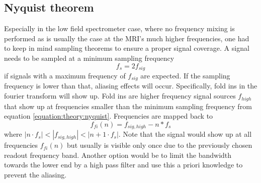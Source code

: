             \subsection{Nyquist theorem}
            Especially in the low field spectrometer case, where no frequency mixing is performed as is usually the case at the MRI's much higher frequencies, one had to keep in mind sampling theorems to ensure a proper signal coverage. A signal needs to be sampled at a minimum sampling frequency \cite{shannon_mathematical_1948}
                \begin{equation}
                    \label{equation:theory:nyquist}
                    f_{s} = 2 f_{sig}
                \end{equation}
                if signals with a maximum frequency of $f_{sig}$ are expected. If the sampling frequency is lower than that, aliasing effects will occur. Specifically, fold ins in the fourier transform will show up. Fold ins are higher frequency signal sources $f_{high}$ that show up at frequencies smaller than the minimum sampling frequency from equation \ref{equation:theory:nyquist}. Frequencies are mapped back to
                \begin{equation}
                    f_{fi}(n) = f_{sig,high} - n * f_s
                \end{equation}
                where $|n\cdot f_s| < |f_{sig,high}| < |n+1 \cdot f_s|$. Note that the signal would show up at all frequencies $f_{fi}(n)$ but usually is visible only once due to the previously chosen readout frequency band.
                Another option would be to limit the bandwidth towards the lower end by a high pass filter and use this a priori knowledge to prevent the aliasing.
